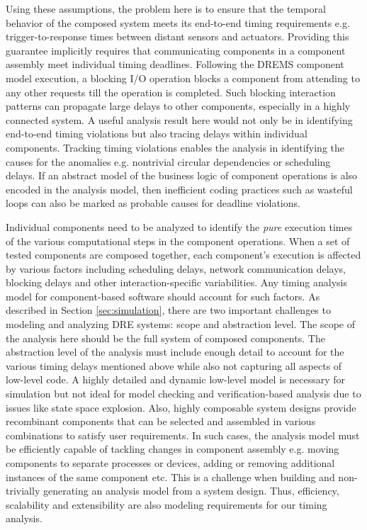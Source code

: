 Using these assumptions, the problem here is to ensure that the temporal behavior of the composed system meets its end-to-end timing requirements e.g. trigger-to-response times between distant sensors and actuators. Providing this guarantee implicitly requires that communicating components in a component assembly meet individual timing deadlines. Following the DREMS component model execution, a blocking I/O operation blocks a component from attending to any other requests till the operation is completed. Such blocking interaction patterns can propagate large delays to other components, especially in a highly connected system. A useful analysis result here would not only be in identifying end-to-end timing violations but also tracing delays within individual components. Tracking timing violations enables the analysis in identifying the causes for the anomalies e.g. nontrivial circular dependencies or scheduling delays. If an abstract model of the business logic of component operations is also encoded in the analysis model, then inefficient coding practices such as wasteful loops can also be marked as probable causes for deadline violations. 

Individual components need to be analyzed to identify the \emph{pure} execution times of the various computational steps in the component operations. When a set of tested components are composed together, each component's execution is affected by various factors including scheduling delays, network communication delays, blocking delays and other interaction-specific variabilities. Any timing analysis model for component-based software should account for such factors. As described in Section \ref{sec:simulation}, there are two important challenges to modeling and analyzing DRE systems: scope and abstraction level. The scope of the analysis here should be the full system of composed components. The abstraction level of the analysis must include enough detail to account for the various timing delays mentioned above while also not capturing all aspects of low-level code. A highly detailed and dynamic low-level model is necessary for simulation but not ideal for model checking and verification-based analysis due to issues like state space explosion. Also, highly composable system designs provide recombinant components that can be selected and assembled in various combinations to satisfy user requirements. In such cases, the analysis model must be efficiently capable of tackling changes in component assembly e.g. moving components to separate processes or devices, adding or removing additional instances of the same component etc. This is a challenge when building and non-trivially generating an analysis model from a system design. Thus, efficiency, scalability and extensibility are also modeling requirements for our timing analysis.

